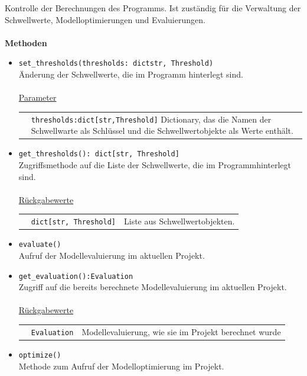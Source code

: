 \documentclass{article}
\begin{document}
Kontrolle der Berechnungen des Programms. Ist zuständig für die Verwaltung der Schwellwerte, Modelloptimierungen und Evaluierungen.\\\\
\textbf{\large{Methoden}}
\begin{itemize}
\item \texttt{set\_thresholds(thresholds: dict{str, Threshold})}\\ Änderung der Schwellwerte, die im Programm hinterlegt sind.\\\\
\underline{{Parameter}}\\
\begin{tabular}{lp{10.7cm}}
 & \texttt{thresholds:dict[str,Threshold]} Dictionary, das die Namen der Schwellwarte als Schlüssel und die Schwellwertobjekte als Werte enthält. \\
\end{tabular}
\item \texttt{get\_thresholds(): dict[str, Threshold]}\\ Zugriffsmethode auf die Liste der Schwellwerte, die im Programmhinterlegt sind.\\\\
\underline{{Rückgabewerte}}\\
\begin{tabular}{lll}
 & \texttt{dict[str, Threshold]} & Liste aus Schwellwertobjekten. \\
\end{tabular}
\item \texttt{evaluate()}\\ Aufruf der Modellevaluierung im aktuellen Projekt.
\item \texttt{get\_evaluation():Evaluation}\\ Zugriff auf die bereits berechnete Modellevaluierung im aktuellen Projekt.\\\\
\underline{{Rückgabewerte}}\\
\begin{tabular}{lll}
 & \texttt{Evaluation} & Modellevaluierung, wie sie im Projekt berechnet wurde \\
\end{tabular}
\item \texttt{optimize()}\\ Methode zum Aufruf der Modelloptimierung im Projekt.\\
\end{itemize}
\end{document}
